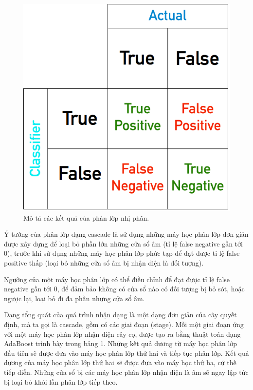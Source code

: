 \documentclass[14pt, oneside, a4paper, openany]{scrartcl}
\begin{document}
\begin{figure}[!h]
	\centering
	\includegraphics[scale=0.5]{figures/binaryclassifier.png} 
	\caption[Mô tả các kết quả của phân lớp nhị phân]{Mô tả các kết quả của phân lớp nhị phân.}
\end{figure}

Ý tưởng của phân lớp dạng cascade là sử dụng những máy học phân lớp đơn giản được xây dựng để loại bỏ phần lớn những cửa sổ âm (tỉ lệ false negative gần tới 0), trước khi sử dụng những máy học phân lớp phức tạp để đạt được tỉ lệ false positive thấp (loại bỏ những cửa sổ âm bị nhận diện là đối tượng).

Ngưỡng của một máy học phân lớp có thể điều chỉnh để đạt được tỉ lệ false negative gần tới 0, để đảm bảo không có cửa sổ nào có đối tượng bị bỏ sót, hoặc ngược lại, loại bỏ đi đa phần nhưng cửa sổ âm.

Dạng tổng quát của quá trình nhận dạng là một dạng đơn giản của cây quyết định, mà ta gọi là cascade, gồm có các giai đoạn (stage). Mỗi một giai đoạn ứng với một máy học phân lớp nhận diện cây cọ, được tạo ra bằng thuật toán dạng AdaBoost trình bày trong bảng 1. Những kết quả dương từ máy học phân lớp đầu tiên sẽ được đưa vào máy học phân lớp thứ hai và tiếp tục phân lớp. Kết quả dương của máy học phân lớp thứ hai sẽ được đưa vào máy học thứ ba, cứ thế tiếp diễn. Những cửa sổ bị các máy học phân lớp nhận diện là âm sẽ ngay lập tức bị loại bỏ khỏi lần phân lớp tiếp theo.
\end{document}
